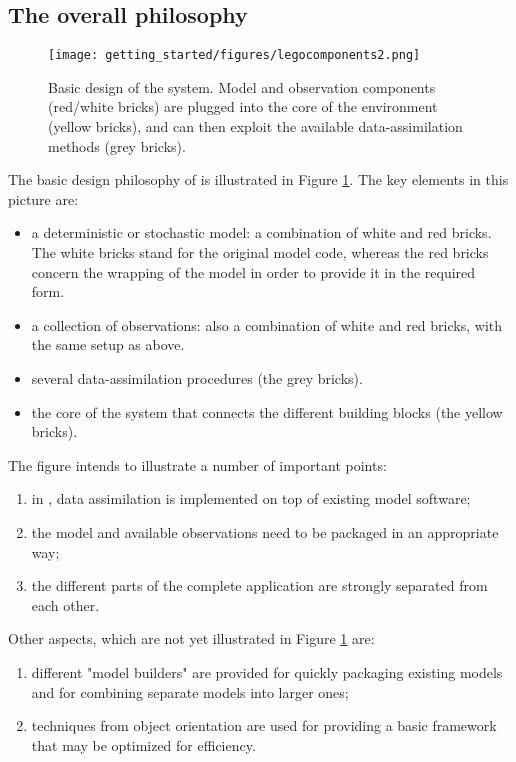 \subsection{The overall philosophy}

\begin{figure}[ht]
\center
\texttt{[image: getting\_started/figures/legocomponents2.png]}
\caption{Basic design of the \oda system. Model and observation components (red/white bricks) are plugged into the core of the \oda environment (yellow bricks), and can then exploit the available data-assimilation methods (grey bricks).}
\label{fig:legoblocks}
\end{figure}

The basic design philosophy of \oda is illustrated in Figure \ref{fig:legoblocks}. The key elements in this picture are:

\begin{itemize}
\item a deterministic or stochastic model: a combination of white and red bricks. The white bricks stand for the original model code, whereas the red bricks concern the wrapping of the model in order to provide it in the required form.
\item a collection of observations: also a combination of white and red bricks, with the same setup as above.
\item several data-assimilation procedures (the grey bricks).
\item the core of the \oda system that connects the different building blocks (the yellow bricks).
\end{itemize}

The figure intends to illustrate a number of important points:

\begin{enumerate}
\item in \oda, data assimilation is implemented on top of existing model software;
\item the model and available observations need to be packaged in an appropriate way;
\item the different parts of the complete application are strongly separated from each other.
\end{enumerate}
    

Other aspects, which are not yet illustrated in Figure \ref{fig:legoblocks} are:

\begin{enumerate}
\item different "model builders" are provided for quickly packaging existing models and for combining separate models into larger ones;
\item techniques from object orientation are used for providing a basic framework that may be optimized for efficiency.
\end{enumerate}

